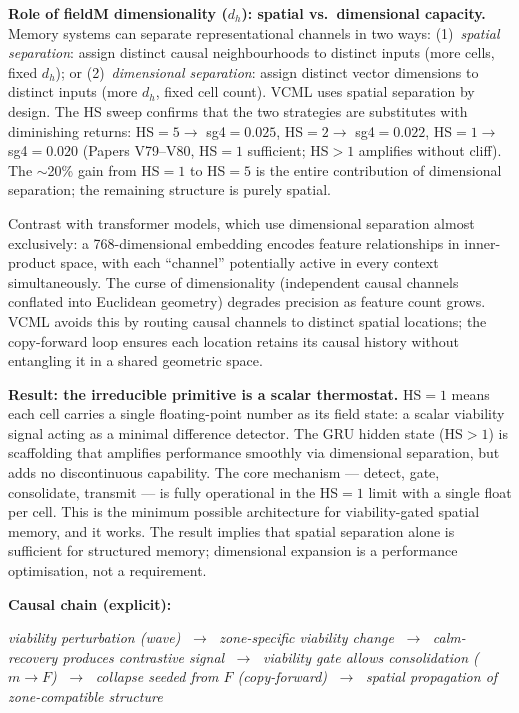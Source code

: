 \documentclass[11pt]{article}
\begin{document}
\textbf{Role of fieldM dimensionality ($d_h$): spatial vs.\ dimensional capacity.}
Memory systems can separate representational channels in two ways:
(1)~\emph{spatial separation}: assign distinct causal neighbourhoods to distinct inputs
(more cells, fixed $d_h$); or
(2)~\emph{dimensional separation}: assign distinct vector dimensions to distinct inputs
(more $d_h$, fixed cell count).
VCML uses spatial separation by design.
The HS sweep confirms that the two strategies are substitutes with diminishing returns:
HS$=5 \to$ sg4$=0.025$, HS$=2 \to$ sg4$=0.022$,
HS$=1 \to$ sg4$=0.020$ (Papers V79--V80, HS$=1$ sufficient; HS$>1$ amplifies without cliff).
The $\sim$20\% gain from HS$=1$ to HS$=5$ is the entire contribution of dimensional separation;
the remaining structure is purely spatial.

Contrast with transformer models, which use dimensional separation almost exclusively:
a 768-dimensional embedding encodes feature relationships in inner-product space,
with each ``channel'' potentially active in every context simultaneously.
The curse of dimensionality (independent causal channels conflated into Euclidean geometry)
degrades precision as feature count grows.
VCML avoids this by routing causal channels to distinct spatial locations;
the copy-forward loop ensures each location retains its causal history without
entangling it in a shared geometric space.

\textbf{Result: the irreducible primitive is a scalar thermostat.}
HS$=1$ means each cell carries a single floating-point number as its field state: a scalar
viability signal acting as a minimal difference detector.
The GRU hidden state (HS$>1$) is scaffolding that amplifies performance smoothly
via dimensional separation, but adds no discontinuous capability.
The core mechanism --- detect, gate, consolidate, transmit --- is fully operational in
the HS$=1$ limit with a single float per cell.
This is the minimum possible architecture for viability-gated spatial memory,
and it works.
The result implies that spatial separation alone is sufficient for structured memory;
dimensional expansion is a performance optimisation, not a requirement.

\textbf{Causal chain (explicit):}

\vspace{0.5em}
\begin{center}
\textit{viability perturbation (wave)}
$\;\to\;$ \textit{zone-specific viability change}
$\;\to\;$ \textit{calm-recovery produces contrastive signal}
$\;\to\;$ \textit{viability gate allows consolidation ($m \to F$)}
$\;\to\;$ \textit{collapse seeded from $F$ (copy-forward)}
$\;\to\;$ \textit{spatial propagation of zone-compatible structure}
\end{center}
\vspace{0.5em}
\end{document}
